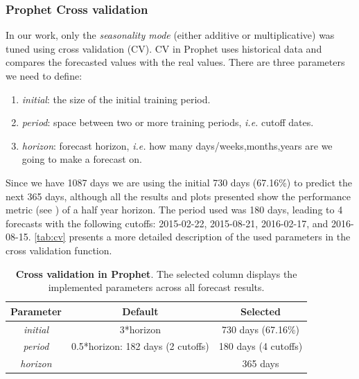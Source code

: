 \subsubsection[Prophet Cross validation]{Prophet Cross validation}
\label{sec:cross-validation}

In our work, only the \textit{seasonality mode}  (either additive or multiplicative)  was tuned using cross validation (CV). CV in Prophet uses historical data and compares the forecasted values with the real values. There are three parameters we need to define:

\begin{enumerate}
\item \textit{initial}: the size of the initial training period. 
\item \textit{period}: space between two or more training periods, \textit{i.e.} cutoff dates. 
\item \textit{horizon}:  forecast horizon, \textit{i.e.} how many days/weeks,months,years are we going to make a forecast on. 
\end{enumerate}  

Since we have 1087 days we are using the initial 730 days (67.16\%) to predict the next 365 days, although all the results and plots presented show the performance metric (see ) of a half year horizon. The period used was 180 days, leading to 4 forecasts with the following cutoffs: 2015-02-22, 2015-08-21, 2016-02-17, and 2016-08-15. \autoref{tab:cv} presents a more detailed description of the used parameters in the cross validation function.

\begin{table}[!htb]
  \caption[Cross validation in Prophet]{\textbf{Cross validation in Prophet}. The selected column displays the implemented parameters across all forecast results.}
  \begin{scriptsize}
    \begin{tabulary}{0.65\linewidth}{ccc}
      \textbf{Parameter} & \textbf{Default} & \textbf{Selected} \\ \hline
      \textit{initial} & 3*horizon & 730 days (67.16\%)  \\
      \textit{period} &  0.5*horizon: 182 days (2 cutoffs) & 180 days (4 cutoffs)   \\
      \textit{horizon} &   & 365 days  \\
    \end{tabulary}
  \end{scriptsize}
  \label{tab:cv}
\end{table}

